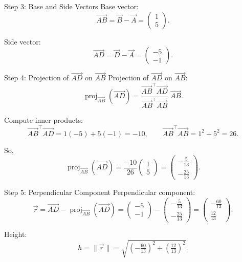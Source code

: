 \documentclass{beamer}
\begin{document}
\begin{frame}{Step 3: Base and Side Vectors}
Base vector:
\begin{equation}
\vec{AB}=\vec B-\vec A=\begin{pmatrix}1\\5\end{pmatrix}.
\end{equation}

Side vector:
\begin{equation}
\vec{AD}=\vec D-\vec A=\begin{pmatrix}-5\\-1\end{pmatrix}.
\end{equation}
\end{frame}

\begin{frame}{Step 4: Projection of $\vec{AD}$ on $\vec{AB}$}
Projection of $\vec{AD}$ on $\vec{AB}$:
\begin{equation}
\operatorname{proj}_{\vec{AB}}(\vec{AD})
=\frac{\vec{AB}^\top\vec{AD}}{\vec{AB}^\top\vec{AB}}\;\vec{AB}.
\end{equation}

Compute inner products:
\begin{equation}
\vec{AB}^\top\vec{AD}=1(-5)+5(-1)=-10,
\qquad
\vec{AB}^\top\vec{AB}=1^2+5^2=26.
\end{equation}

So,
\begin{equation}
\operatorname{proj}_{\vec{AB}}(\vec{AD})
=\frac{-10}{26}\begin{pmatrix}1\\5\end{pmatrix}
=\begin{pmatrix}-\tfrac{5}{13}\\[4pt]-\tfrac{25}{13}\end{pmatrix}.
\end{equation}
\end{frame}

\begin{frame}{Step 5: Perpendicular Component}
Perpendicular component:
\begin{equation}
\vec r=\vec{AD}-\operatorname{proj}_{\vec{AB}}(\vec{AD})
=\begin{pmatrix}-5\\-1\end{pmatrix}
-\begin{pmatrix}-\tfrac{5}{13}\\[4pt]-\tfrac{25}{13}\end{pmatrix}
=\begin{pmatrix}-\tfrac{60}{13}\\[4pt]\tfrac{12}{13}\end{pmatrix}.
\end{equation}

Height:
\begin{equation}
h=\|\vec r\|
=\sqrt{\left(-\tfrac{60}{13}\right)^2+\left(\tfrac{12}{13}\right)^2}.
\end{equation}
\end{frame}
\end{document}

